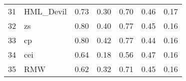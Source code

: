 \documentclass[12pt]{article}
\begin{document}
\begin{footnotesize}
\begin{longtable}{rl|c|c|c|c|c}
				31                   & HML\_Devil                  & 0.73                             & 0.30                                                                                          & 0.70                                                                                          & 0.46                                                                                          & 0.17                                                                                                   \\
				32                   & zs                          & 0.80                             & 0.40                                                                                          & 0.77                                                                                          & 0.45                                                                                          & 0.16                                                                                                   \\
				33                   & cp                          & 0.80                             & 0.42                                                                                          & 0.77                                                                                          & 0.44                                                                                          & 0.16                                                                                                   \\
				34                   & cei                         & 0.64                             & 0.18                                                                                          & 0.56                                                                                          & 0.47                                                                                          & 0.16                                                                                                   \\
				35                   & RMW                         & 0.62                             & 0.32                                                                                          & 0.71                                                                                          & 0.45                                                                                          & 0.16                                                                                                   \\

\end{longtable}
\end{footnotesize}
\end{document}
